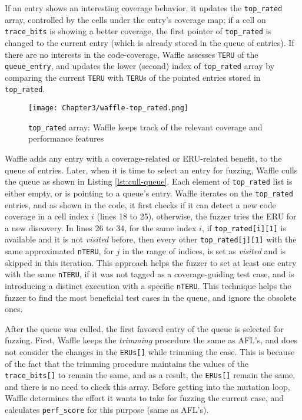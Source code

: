 If an entry shows an interesting coverage behavior, it updates the \texttt{top\_rated} array, controlled by the cells under the entry's coverage map; if a cell on \texttt{trace\_bits} is showing a better coverage, the first pointer of \texttt{top\_rated} is changed to the current entry (which is already stored in the queue of entries). If there are no interests in the code-coverage, Waffle assesses \texttt{TERU} of the \texttt{queue\_entry}, and updates the lower (second) index of \texttt{top\_rated} array by comparing the current \texttt{TERU} with \texttt{TERU}s of the pointed entries stored in \texttt{top\_rated}.

\begin{figure}[!b]
  \texttt{[image: Chapter3/waffle-top\_rated.png]}
  \centering
  \caption{\texttt{top\_rated} array: Waffle keeps track of the relevant coverage and performance features}
  \label{fig:waffle-top_rated}
\end{figure}


Waffle adds any entry with a coverage-related or ERU-related benefit, to the queue of entries. Later, when it is time to select an entry for fuzzing, Waffle culls the queue as shown in Listing \ref{lst:cull-queue}. Each element of \texttt{top\_rated} list is either empty, or is pointing to a queue's entry. Waffle iterates on the \texttt{top\_rated} entries, and as shown in the code, it first checks if it can detect a new code coverage in a cell index $i$ (lines 18 to 25), otherwise, the fuzzer tries the ERU for a new discovery. In lines 26 to 34, for the same index $i$, if \texttt{top\_rated[i][1]} is available and it is not \textit{visited} before, then every other \texttt{top\_rated[j][1]} with the same approximated \texttt{nTERU}, for $j$ in the range of indices, is set as \textit{visited} and is skipped in this iteration. This approach helps the fuzzer to set at least one entry with the same \texttt{nTERU}, if it was not tagged as a coverage-guiding test case, and is introducing a distinct execution with a specific \texttt{nTERU}. This technique helps the fuzzer to find the most beneficial test cases in the queue, and ignore the obsolete ones.




After the queue was culled, the first favored entry of the queue is selected for fuzzing. First, Waffle keeps the \textit{trimming} procedure the same as AFL's, and does not consider the changes in the \texttt{ERUs[]} while trimming the case. This is because of the fact that the trimming procedure maintains the values of the \texttt{trace\_bits[]} to remain the same, and as a result, the \texttt{ERUs[]} remain the same, and there is no need to check this array. Before getting into the mutation loop, Waffle determines the effort it wants to take for fuzzing the current case, and calculates \texttt{perf\_score} for this purpose (same as AFL's).

